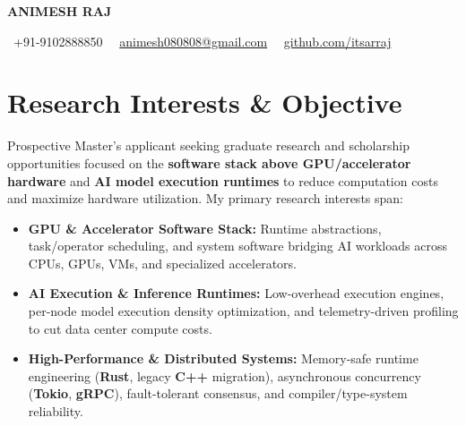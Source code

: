 \documentclass[a4paper,11pt]{article}
\newcommand{\socialicon}[1]{\raisebox{-0.05em}{\resizebox{!}{1em}{#1}}}
\newcommand{\headerfontiii}{\fontfamily{ppl}\selectfont} %
\begin{document}
\headerfontiii

\begin{center}
    {\Huge\textbf{ANIMESH RAJ}}
\end{center}
\vspace{-5.5mm}

\begin{center}
    {\small
    \socialicon{\faPhone}\ +91-9102888850 \textbar\ 
    \socialicon{\faEnvelope}\ \href{mailto:animesh080808@gmail.com}{animesh080808@gmail.com} \textbar\ 
    \socialicon{\faGithub}\ \href{https://github.com/itsarraj}{github.com/itsarraj}
    }
\end{center}
\vspace{-4mm}

\section{\textbf{Research Interests \& Objective}}
\vspace{1mm}
{\small
Prospective Master's applicant seeking graduate research and scholarship opportunities focused on the \textbf{software stack above GPU/accelerator hardware} and \textbf{AI model execution runtimes} to reduce computation costs and maximize hardware utilization. My primary research interests span:
\begin{itemize}[leftmargin=3ex, itemsep=0.4mm, topsep=1mm]
    \item \textbf{GPU \& Accelerator Software Stack:} Runtime abstractions, task/operator scheduling, and system software bridging AI workloads across CPUs, GPUs, VMs, and specialized accelerators.
    \item \textbf{AI Execution \& Inference Runtimes:} Low-overhead execution engines, per-node model execution density optimization, and telemetry-driven profiling to cut data center compute costs.
    \item \textbf{High-Performance \& Distributed Systems:} Memory-safe runtime engineering (\textbf{Rust}, legacy \textbf{C++} migration), asynchronous concurrency (\textbf{Tokio}, \textbf{gRPC}), fault-tolerant consensus, and compiler/type-system reliability.
\end{itemize}
}
\vspace{-3mm}
\end{document}
